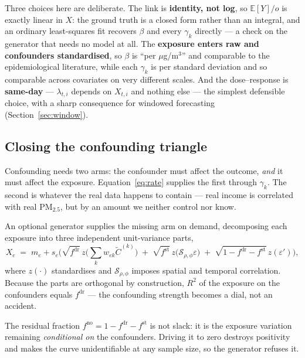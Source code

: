 \documentclass[11pt]{article}
\newcommand{\Exp}{\mathbb{E}}
\begin{document}
Three choices here are deliberate. The link is \textbf{identity, not log}, so $\Exp[Y]/o$ is
exactly linear in $X$: the ground truth is a closed form rather than an integral, and an ordinary
least-squares fit recovers $\beta$ and every $\gamma_k$ directly --- a check on the generator that
needs no model at all. The \textbf{exposure enters raw and confounders standardised}, so $\beta$ is
``per $\mu$g/m$^3$'' and comparable to the epidemiological literature, while each $\gamma_k$ is per
standard deviation and so comparable across covariates on very different scales. And the
dose--response is \textbf{same-day} --- $\lambda_{t,i}$ depends on $X_{t,i}$ and nothing else ---
the simplest defensible choice, with a sharp consequence for windowed forecasting
(Section~\ref{sec:window}).

\subsection*{Closing the confounding triangle}

Confounding needs two arms: the confounder must affect the outcome, \emph{and} it must affect the
exposure. Equation~\eqref{eq:rate} supplies the first through $\gamma_k$. The second is whatever
the real data happens to contain --- real income is correlated with real PM$_{2.5}$, but by an
amount we neither control nor know.

An optional generator supplies the missing arm on demand, decomposing each exposure into three
independent unit-variance parts,
\begin{equation}\label{eq:expo}
  X_e \;=\; m_e + s_e\Big(\sqrt{f^{\mathrm{dr}}}\, z\big(\textstyle\sum_k w_{ek}\tilde C^{(k)}\big)
        \;+\; \sqrt{f^{\mathrm{st}}}\, z\big(\mathcal{S}_{\rho,\phi}\varepsilon\big)
        \;+\; \sqrt{1 - f^{\mathrm{dr}} - f^{\mathrm{st}}}\, z(\varepsilon')\Big),
\end{equation}
where $z(\cdot)$ standardises and $\mathcal{S}_{\rho,\phi}$ imposes spatial and temporal
correlation. Because the parts are orthogonal by construction, $R^2$ of the exposure on the
confounders equals $f^{\mathrm{dr}}$ --- the confounding strength becomes a dial, not an accident.

The residual fraction $f^{\mathrm{no}} = 1 - f^{\mathrm{dr}} - f^{\mathrm{st}}$ is not slack: it is
the exposure variation remaining \emph{conditional on} the confounders. Driving it to zero destroys
positivity and makes the curve unidentifiable at any sample size, so the generator refuses it.
\end{document}

